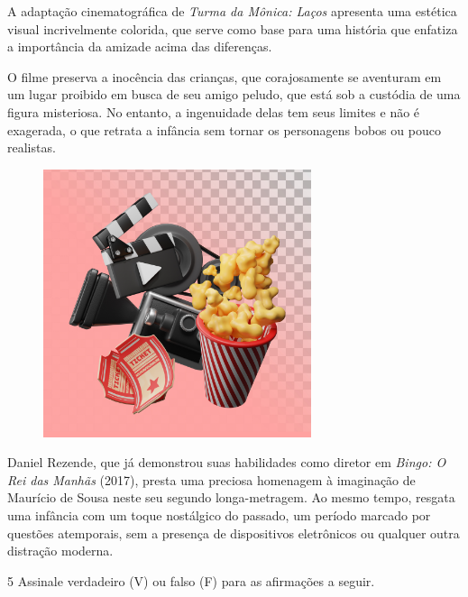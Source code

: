 \begin{myquote}
A adaptação cinematográfica de \emph{Turma da Mônica: Laços} apresenta
uma estética visual incrivelmente colorida, que serve como base para uma
história que enfatiza a importância da amizade acima das diferenças.

O filme preserva a inocência das crianças, que corajosamente se
aventuram em um lugar proibido em busca de seu amigo peludo, que está
sob a custódia de uma figura misteriosa. No entanto, a ingenuidade delas
tem seus limites e não é exagerada, o que retrata a infância sem tornar
os personagens bobos ou pouco realistas.

\begin{figure}[H]
\centering\includegraphics[width=0.7\textwidth]{./imgSAEB_6_POR/freepik/PORT_6_IMG-3.jpeg}
\end{figure}

Daniel Rezende, que já demonstrou suas habilidades como diretor em
\emph{Bingo: O Rei das Manhãs} (2017), presta uma preciosa homenagem à
imaginação de Maurício de Sousa neste seu segundo longa-metragem. Ao
mesmo tempo, resgata uma infância com um toque nostálgico do passado, um
período marcado por questões atemporais, sem a presença de dispositivos
eletrônicos ou qualquer outra distração moderna.

\end{myquote}




\num{5} Assinale verdadeiro (V) ou falso (F) para as afirmações a
seguir.

